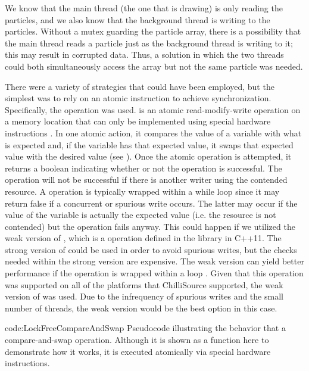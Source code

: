 We know that the main thread (the one that is drawing) is only reading the particles, and we also know that the background thread is writing to the particles. Without a mutex guarding the particle array, there is a possibility that the main thread reads a particle just as the background thread is writing to it; this may result in corrupted data. Thus, a solution in which the two threads could both simultaneously access the array but not the same particle was needed.

There were a variety of strategies that could have been employed, but the simplest was to rely on an atomic instruction to achieve synchronization. Specifically, the  operation was used.  is an atomic read-modify-write operation on a memory location that can only be implemented using special hardware instructions \cite{Mullender2008Semaphores}. In one atomic action, it compares the value of a variable with what is expected and, if the variable has that expected value, it swaps that expected value with the desired value (see ). Once the atomic operation is attempted, it returns a boolean indicating whether or not the operation is successful. The operation will not be successful if there is another writer using the contended resource. A  operation is typically wrapped within a while loop since it may return false if a concurrent or spurious write occurs. The latter may occur if the value of the variable is actually the expected value (i.e. the resource is not contended) but the operation fails anyway. This could happen if we utilized the weak version of  \cite{CPPReferenceAtomicCompareExchange}, which is a  operation defined in the  library in C++11. The strong version of  could be used in order to avoid spurious writes, but the checks needed within the strong version are expensive. The weak version can yield better performance if the operation is wrapped within a loop \cite{CPPReferenceAtomicCompareExchange}. Given that this operation was supported on all of the platforms that ChilliSource supported, the weak version of  was used. Due to the infrequency of spurious writes and the small number of threads, the weak version would be the best option in this case.

\vspace{-0.5cm}
{code:LockFreeCompareAndSwap}
{Pseudocode illustrating the behavior that a compare-and-swap operation. Although it is shown as a function here to demonstrate how it works, it is executed atomically via special hardware instructions.}
\vspace{-0.5cm}

